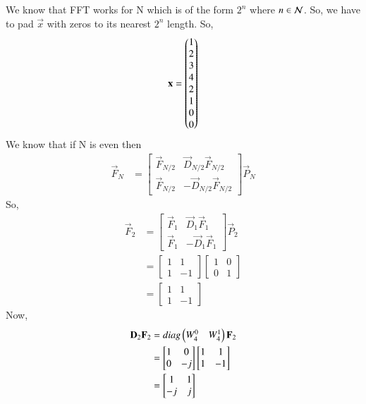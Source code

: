 \documentclass[journal,12pt,twocolumn]{IEEEtran}
\renewcommand\thesection{\arabic{section}}
\begin{document}
\begin{enumerate}[label=\arabic*.,ref=\thesection.\theenumi]
	\solution  We know that FFT works for N  which is of the form $2^n$ where $n\in \cal N$.
	So, we have to pad $\vec{x}$ with zeros to its nearest $2^n$ length.
	So,
	\begin{align}
		\mathbf{x}=\begin{pmatrix}1\\2\\3\\4\\2\\1\\0\\0\end{pmatrix}
	\end{align}
We know that if N is even then
\begin{align}
	\vec{F}_N&=\begin{bmatrix}
		\vec{F}_{N/2}&\vec{D}_{N/2}\vec{F}_{N/2}\\
		\vec{F}_{N/2}&-\vec{D}_{N/2}\vec{F}_{N/2}
	\end{bmatrix}\vec{P}_N
\end{align}
So,
\begin{align}
	\vec{F}_2&=\begin{bmatrix}
		\vec{F}_{1}&\vec{D}_{1}\vec{F}_{1}\\
		\vec{F}_{1}&-\vec{D}_{1}\vec{F}_{1}
	\end{bmatrix}\vec{P}_2\\
&=\begin{bmatrix}
	1& 1\\
	1&-1
\end{bmatrix}
\begin{bmatrix}
1& 0\\
0&1
\end{bmatrix}\\
&=\begin{bmatrix}
	1& 1\\
	1&-1
\end{bmatrix}
\end{align}
Now,
\begin{align}
	\vec{D}_{2}\vec{F}_{2}&=diag\myvec{W_{4}^{0} & W_{4}^{1}}\vec{F}_{2}\\
	&=\begin{bmatrix}
		1& 0\\
		0&-j
	\end{bmatrix}
\begin{bmatrix}
	1& 1\\
	1&-1
\end{bmatrix}\\
&=\begin{bmatrix}
	1& 1\\
	-j&j
\end{bmatrix}

\end{align}
\end{enumerate}
\end{document}
